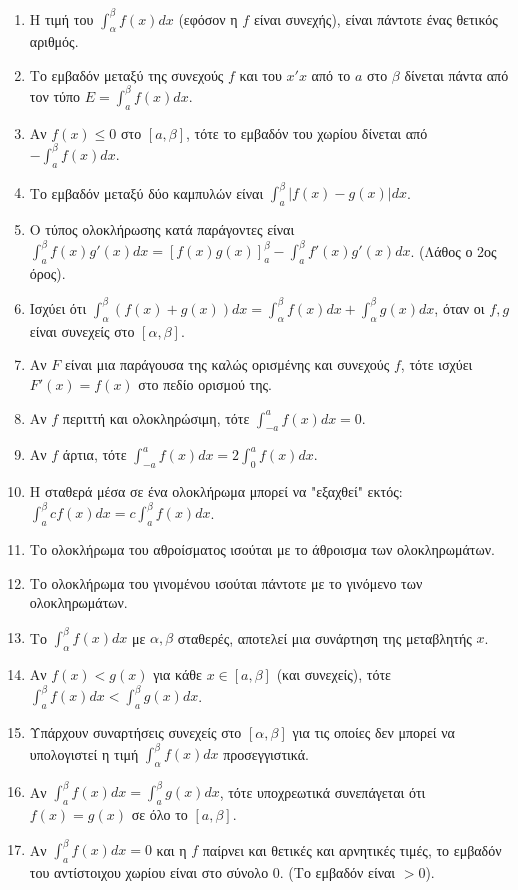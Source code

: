 \documentclass[11pt,a4paper]{article}
\newcommand{\dint}{\displaystyle\int}
\begin{document}
\begin{enumerate}[label=\textbf{3.\arabic*.}]
    \item Η τιμή του $\dint_{\alpha}^{\beta} f(x) dx$ (εφόσον η $f$ είναι συνεχής), είναι πάντοτε ένας θετικός αριθμός.
    \item Το εμβαδόν μεταξύ της συνεχούς $f$ και του $x'x$ από το $a$ στο $\beta$ δίνεται πάντα από τον τύπο $E = \dint_a^\beta f(x) dx$. 
    \item Αν $f(x) \le 0$ στο $[a, \beta]$, τότε το εμβαδόν του χωρίου δίνεται από $-\dint_a^\beta f(x) dx$.
    \item Το εμβαδόν μεταξύ δύο καμπυλών είναι $\dint_a^\beta |f(x) - g(x)| dx$.
    \item Ο τύπος ολοκλήρωσης κατά παράγοντες είναι $\dint_a^\beta f(x)g'(x) dx = [f(x)g(x)]_a^\beta - \dint_a^\beta f'(x)g'(x) dx$. (Λάθος ο 2ος όρος).
    \item Ισχύει ότι $\dint_{\alpha}^{\beta} (f(x) + g(x)) dx = \dint_{\alpha}^{\beta} f(x) dx + \dint_{\alpha}^{\beta} g(x) dx$, όταν οι $f, g$ είναι συνεχείς στο $[\alpha, \beta]$.
    \item Αν $F$ είναι μια παράγουσα της καλώς ορισμένης και συνεχούς $f$, τότε ισχύει $F'(x) = f(x)$ στο πεδίο ορισμού της.
    \item Αν $f$ περιττή και ολοκληρώσιμη, τότε $\dint_{-a}^a f(x) dx = 0$.
    \item Αν $f$ άρτια, τότε $\dint_{-a}^a f(x) dx = 2 \dint_0^a f(x) dx$.
    \item Η σταθερά μέσα σε ένα ολοκλήρωμα μπορεί να "εξαχθεί" εκτός: $\dint_a^\beta c f(x) dx = c \dint_a^\beta f(x) dx$.
    \item Το ολοκλήρωμα του αθροίσματος ισούται με το άθροισμα των ολοκληρωμάτων.
    \item Το ολοκλήρωμα του γινομένου ισούται πάντοτε με το γινόμενο των ολοκληρωμάτων.
    \item Το $\dint_{\alpha}^{\beta} f(x) dx$ με $\alpha, \beta$ σταθερές, αποτελεί μια συνάρτηση της μεταβλητής $x$.
    \item Αν $f(x) < g(x)$ για κάθε $x \in [a, \beta]$ (και συνεχείς), τότε $\dint_a^\beta f(x) dx < \dint_a^\beta g(x) dx$.
    \item Υπάρχουν συναρτήσεις συνεχείς στο $[\alpha, \beta]$ για τις οποίες δεν μπορεί να υπολογιστεί η τιμή $\dint_{\alpha}^{\beta} f(x) dx$ προσεγγιστικά.
    \item Αν $\dint_a^\beta f(x) dx = \dint_a^\beta g(x) dx$, τότε υποχρεωτικά συνεπάγεται ότι $f(x) = g(x)$ σε όλο το $[a, \beta]$.
    \item Αν $\dint_a^\beta f(x) dx = 0$ και η $f$ παίρνει και θετικές και αρνητικές τιμές, το εμβαδόν του αντίστοιχου χωρίου είναι στο σύνολο 0. (Το εμβαδόν είναι $>0$).

\end{enumerate}
\end{document}
